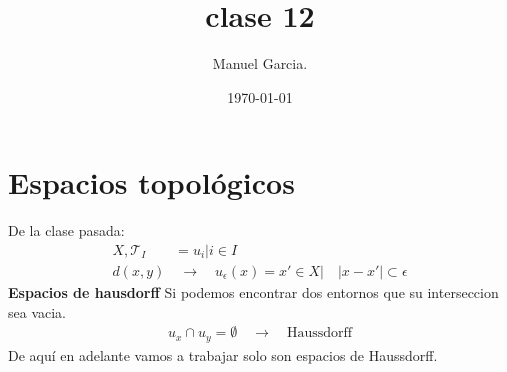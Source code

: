 \documentclass{article}
\title{clase 12 }
\author{Manuel Garcia.}
\date{\today}
\begin{document}
\maketitle

\section{Espacios topológicos }
De la clase pasada: 
\begin{gather*}
  {X, \mathcal{T }_I } \qquad \mathcal = {u_i | i \in I }\\
  d(x,y) \quad \rightarrow \quad u_\epsilon(x) = {x' \in X |\quad \left|x-x'\right| \subset \epsilon} 
\end{gather*}
\textbf{Espacios de hausdorff } Si podemos encontrar dos entornos que su interseccion sea vacia. 
\begin{gather*}
  u_x \cap u_y = \emptyset \quad \rightarrow \quad \text{Haussdorff} 
\end{gather*}
De aquí en adelante vamos a trabajar solo son espacios de Haussdorff.

\hfill 

\hfill 
\end{document}
